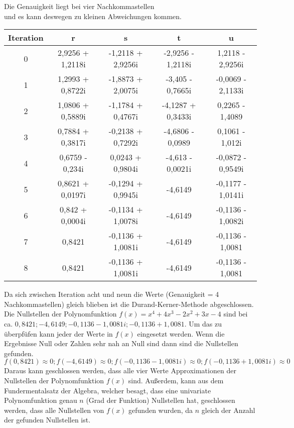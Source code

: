 \documentclass[12pt]{article}
\begin{document}
        \begin{center}
        Die Genauigkeit liegt bei vier Nachkommastellen \\ und es kann deswegen zu kleinen Abweichungen kommen.
        \begin{tabular}{c|c c c c}
            Iteration & r & s & t & u \\
            \hline
            0 & 2,9256 + 1,2118i & -1,2118 + 2,9256i & -2,9256 - 1,2118i & 1,2118 - 2,9256i \\
            1 & 1,2993 + 0,8722i & -1,8873 + 2,0075i & -3,405 - 0,7665i & -0,0069 - 2,1133i \\
            2 & 1,0806 + 0,5889i & -1,1784 + 0,4767i & -4,1287 + 0,3433i & 0,2265 - 1,4089 \\
            3 & 0,7884 + 0,3817i & -0,2138 + 0,7292i & -4,6806 - 0,0989 & 0,1061 - 1,012i \\
            4 & 0,6759 - 0,234i & 0,0243 + 0,9804i & -4,613 - 0,0021i & -0,0872 - 0,9549i \\
            5 & 0,8621 + 0,0197i & -0,1294 + 0,9945i & -4,6149 & -0,1177 - 1,0141i \\
            6 & 0,842 + 0,0004i & -0,1134 + 1,0078i & -4,6149 & -0,1136 - 1,0082i \\
            7 & 0,8421 & -0,1136 + 1,0081i & -4,6149 & -0,1136 - 1,0081 \\
            8 & 0,8421 & -0,1136 + 1,0081i & -4,6149 & -0,1136 - 1,0081 \\
        \end{tabular}
        \end{center}
        Da sich zwischen Iteration acht und neun die Werte (Genauigkeit = 4 Nachkommastellen) gleich blieben ist die Durand-Kerner-Methode abgeschlossen. Die Nullstellen der Polynomfunktion $f(x) = x^4 + 4x^3 - 2x^2 + 3x - 4$ sind bei ca. $0,8421; -4,6149; -0,1136 - 1,0081i; -0,1136 + 1,0081$. Um das zu überpfüfen kann jeder der Werte in $f(x)$ eingesetzt werden. Wenn die Ergebnisse Null oder Zahlen sehr nah an Null sind dann sind die Nullstellen gefunden.
        \begin{displaymath}
            f(0,8421) \approx 0; f(-4,6149) \approx 0; f(-0,1136 - 1,0081i) \approx 0; f(-0,1136 + 1,0081i) \approx 0
        \end{displaymath}
        Daraus kann geschlossen werden, dass alle vier Werte Approximationen der Nullstellen der Polynomfunktion $f(x)$ sind. Außerdem, kann aus dem Fundermentalsatz der Algebra, welcher besagt, dass eine univariate Polynomfunktion genau $n$ (Grad der Funktion) Nullstellen hat, geschlossen werden, dass alle Nullstellen von $f(x)$ gefunden wurden, da $n$ gleich der Anzahl der gefunden Nullstellen ist.
        
\end{document}
